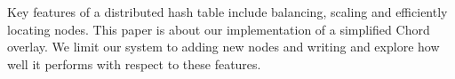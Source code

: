 Key features of a distributed hash table include balancing, scaling and efficiently locating nodes. This paper is about our implementation of a simplified Chord overlay. We limit our system to adding new nodes and writing and explore how well it performs with respect to these features.